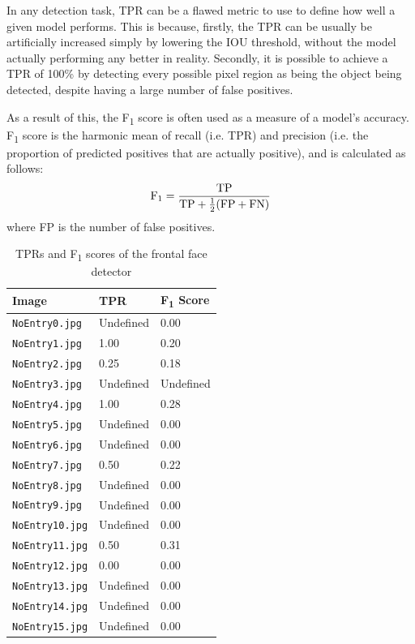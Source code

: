 \documentclass[twocolumn, 10pt, a4paper]{article}
\begin{document}
In any detection task, TPR can be a flawed metric to use to define how well a given model performs.
This is because, firstly, the TPR can be usually be artificially increased simply by lowering the IOU threshold, without the model actually performing any better in reality.
Secondly, it is possible to achieve a TPR of 100\% by detecting every possible pixel region as being the object being detected, despite having a large number of false positives.

As a result of this, the F\textsubscript{1} score is often used as a measure of a model's accuracy.
F\textsubscript{1} score is the harmonic mean of recall (i.e. TPR) and precision (i.e. the proportion of predicted positives that are actually positive), and is calculated as follows:
\[
  \textrm{F\textsubscript{1}} = \frac{\textrm{TP}}{\textrm{TP} + \frac{1}{2}(\textrm{FP} + \textrm{FN})}
\]
where FP is the number of false positives. 

\begin{table}[htbp]
  \begin{center}
  \caption{TPRs and F\textsubscript{1} scores of the frontal face detector}\label{tab:face}
  \begin{tabular}{l | l l} 
    \hline\hline
    Image&TPR&F\textsubscript{1} Score\\
    \hline
    \texttt{NoEntry0.jpg}&Undefined&0.00\\ 
    \texttt{NoEntry1.jpg}&1.00&0.20\\ 
    \texttt{NoEntry2.jpg}&0.25&0.18\\ 
    \texttt{NoEntry3.jpg}&Undefined&Undefined\\ 
    \texttt{NoEntry4.jpg}&1.00&0.28\\ 
    \texttt{NoEntry5.jpg}&Undefined&0.00\\ 
    \texttt{NoEntry6.jpg}&Undefined&0.00\\ 
    \texttt{NoEntry7.jpg}&0.50&0.22\\ 
    \texttt{NoEntry8.jpg}&Undefined&0.00\\ 
    \texttt{NoEntry9.jpg}&Undefined&0.00\\ 
    \texttt{NoEntry10.jpg}&Undefined&0.00\\ 
    \texttt{NoEntry11.jpg}&0.50&0.31\\ 
    \texttt{NoEntry12.jpg}&0.00&0.00\\ 
    \texttt{NoEntry13.jpg}&Undefined&0.00\\ 
    \texttt{NoEntry14.jpg}&Undefined&0.00\\ 
    \texttt{NoEntry15.jpg}&Undefined&0.00\\ 
    \hline
  \end{tabular}
  \end{center}
\end{table} 
\end{document}
